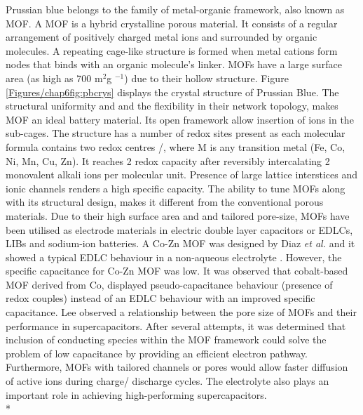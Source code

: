 Prussian blue belongs to the family of metal-organic framework, also known as MOF. A MOF is a hybrid crystalline porous material. It consists of a regular arrangement of positively charged metal ions and surrounded by organic molecules. A repeating cage-like structure is formed when metal cations form nodes that binds with an organic molecule's linker. MOFs have a large surface area (as high as 700 m$^{2}$g $^{-1}$) due to their hollow structure. Figure \ref{Figures/chap6fig:pbcrys} displays the crystal structure of Prussian Blue. The structural uniformity and and the flexibility in their network topology, makes MOF an ideal battery material. Its open framework allow insertion of ions in the sub-cages. The structure has a number of redox sites present as each molecular formula contains two redox centres /, where M is any transition metal (Fe, Co, Ni, Mn, Cu, Zn). It reaches 2 redox capacity after reversibly intercalating 2 monovalent alkali ions per molecular unit. Presence of large lattice interstices and ionic channels renders a high specific capacity. The ability to tune MOFs along with its structural design, makes it different from the conventional porous materials. Due to their high surface area and and tailored pore-size, MOFs have been utilised as electrode materials in electric double layer capacitors or EDLCs, LIBs and sodium-ion batteries. A Co-Zn MOF was designed by Diaz \textit{et al.} and it showed a typical EDLC behaviour in a non-aqueous electrolyte \cite{diaz}. However, the specific capacitance for Co-Zn MOF was low. It was observed that cobalt-based MOF derived from Co, displayed pseudo-capacitance behaviour (presence of redox couples) instead of an EDLC behaviour with an improved specific capacitance. Lee  observed a relationship between the pore size of MOFs and their performance in supercapacitors. After several attempts, it was determined that inclusion of conducting species within the MOF framework could solve the problem of low capacitance by providing an efficient electron pathway. Furthermore, MOFs with tailored channels or pores would allow faster diffusion of active ions during charge/ discharge cycles. The electrolyte also plays an important role in achieving high-performing supercapacitors. \\*
